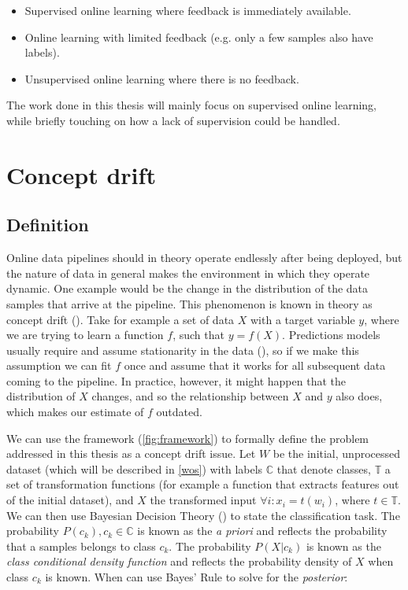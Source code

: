 \documentclass[12pt]{extreport}
\begin{document}
\begin{itemize}
    \item Supervised online learning where feedback is immediately available.
    \item Online learning with limited feedback (e.g. only a few samples also have labels).
    \item Unsupervised online learning where there is no feedback.
\end{itemize}

The work done in this thesis will mainly focus on supervised online learning, while briefly touching on how a lack of supervision could be handled.

\section{Concept drift} \label{concept-drift}

\subsection{Definition}

Online data pipelines should in theory operate endlessly after being deployed, but the nature of data in general makes the environment in which they operate dynamic. One example would be the change in the distribution of the data samples that arrive at the pipeline. This phenomenon is known in theory as concept drift (\cite{survey-concept-drift}). Take for example a set of data $X$ with a target variable $y$, where we are trying to learn a function $f$, such that $y = f(X)$. Predictions models usually require and assume stationarity in the data (\cite{Heng_Wang_2015}), so if we make this assumption we can fit $f$ once and assume that it works for all subsequent data coming to the pipeline. In practice, however, it might happen that the distribution of $X$ changes, and so the relationship between $X$ and $y$ also does, which makes our estimate of $f$ outdated.

We can use the framework (\ref{fig:framework}) to formally define the problem addressed in this thesis as a concept drift issue. Let $W$ be the initial, unprocessed dataset (which will be described in \ref{wos}) with labels $\mathbb{C}$ that denote classes, $\mathbb{T}$ a set of transformation functions (for example a function that extracts features out of the initial dataset), and $X$ the transformed input $\forall i: x_i = t(w_i)$, where $t \in \mathbb{T}$. We can then use Bayesian Decision Theory (\cite{pattern-classification}) to state the classification task. The probability $P(c_k), c_k \in \mathbb{C}$ is known as the \emph{a priori} and reflects the probability that a samples belongs to class $c_k$. The probability $P(X|c_k)$ is known as the \emph{class conditional density function} and reflects the probability density of $X$ when class $c_k$ is known. When can use Bayes' Rule to solve for the \emph{posterior}:
\end{document}
